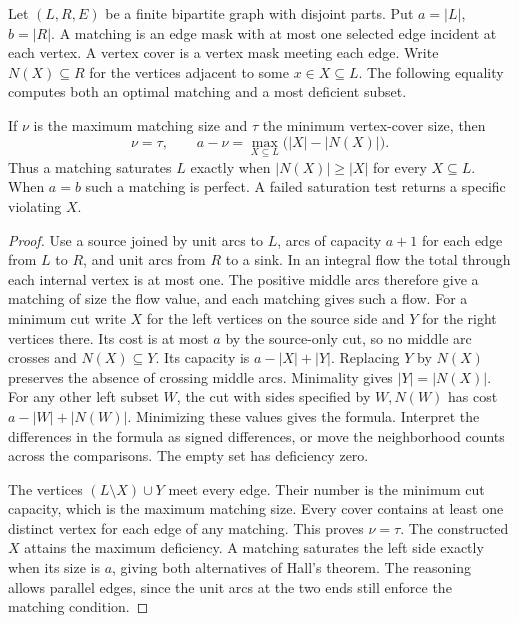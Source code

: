 Let $(L,R,E)$ be a finite bipartite graph with disjoint parts. Put
$a=|L|$, $b=|R|$. A matching is an edge mask with at most one selected
edge incident at each vertex. A vertex cover is a vertex mask meeting
each edge. Write $N(X)\subseteq R$ for the vertices adjacent to
some $x\in X\subseteq L$. The following equality computes both an
optimal matching and a most deficient subset.

\begin{theorem}\leavevmode\label{fl:hall}
If $\nu$ is the maximum matching size and $\tau$ the minimum vertex-cover
size, then
\[
 \nu=\tau,\qquad
 a-\nu=\max_{X\subseteq L}\bigl(|X|-|N(X)|\bigr).
\]
Thus a matching saturates $L$ exactly when $|N(X)|\ge |X|$ for every
$X\subseteq L$. When $a=b$ such a matching is perfect. A failed
saturation test returns a specific violating $X$.
\end{theorem}
\begin{proof}
Use a source joined by unit arcs to $L$, arcs of capacity $a+1$
for each edge from $L$ to $R$, and unit arcs from $R$ to a sink.
In an integral flow the total through each internal vertex is at
most one. The positive middle arcs therefore give a matching of
size the flow value, and each matching gives such a flow. For a
minimum cut write $X$ for the left vertices on the source side and
$Y$ for the right vertices there. Its cost is at most $a$ by the
source-only cut, so no middle arc crosses and $N(X)\subseteq Y$.
Its capacity is $a-|X|+|Y|$. Replacing $Y$ by $N(X)$ preserves the
absence of crossing middle arcs. Minimality gives $|Y|=|N(X)|$.
For any other left subset $W$, the cut with sides specified by
$W,N(W)$ has cost $a-|W|+|N(W)|$. Minimizing these values gives
the formula. Interpret the differences in the formula as signed
differences, or move the neighborhood counts across the comparisons.
The empty set has deficiency zero.

The vertices $(L\setminus X)\cup Y$ meet every edge. Their number is
the minimum cut capacity, which is the maximum matching size.
Every cover contains at least one distinct vertex for each edge of
any matching. This proves $\nu=\tau$. The constructed $X$ attains
the maximum deficiency. A matching saturates the left side exactly
when its size is $a$, giving both alternatives of Hall's theorem.
The reasoning allows parallel edges, since the unit arcs at the two
ends still enforce the matching condition.
\end{proof}

